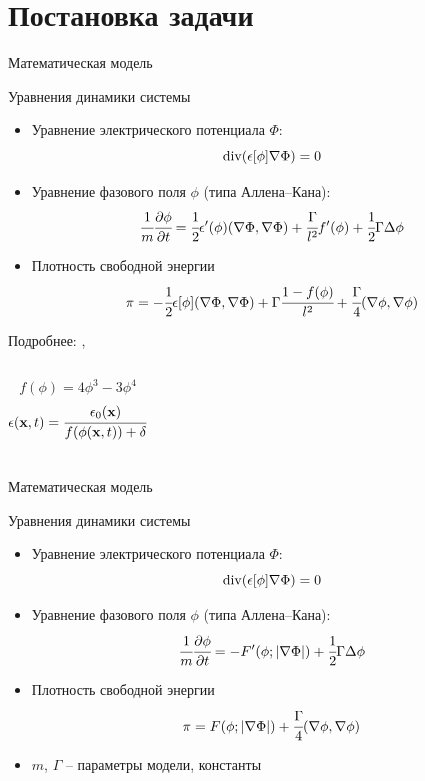 
\section{Постановка задачи}

\begin{frame}{Математическая модель}
\vspace{-0.3cm}
\begin{block}{Уравнения динамики системы}
	\begin{itemize}
		\item Уравнение электрического потенциала $\Phi$:
		\[
			\operatorname{{div}}(\epsilon[\phi] \nabla \Phi) = 0
		\]
		\item Уравнение фазового поля $\phi$ (типа Аллена--Кана):
		\[
			\cfrac{1}{m} \cfrac{\partial \phi}{\partial t} = \cfrac{1}{2} \epsilon'(\phi) (\nabla \Phi, \nabla \Phi) + \cfrac{\Gamma}{l^2} f'(\phi) + \cfrac{1}{2} \Gamma \Delta \phi
		\]
	\end{itemize}
\end{block}
\begin{itemize}
	\item Плотность свободной энергии
	\vspace{-0.2cm}
	\[
		\pi = -\cfrac{1}{2} \epsilon[\phi] (\nabla \Phi, \nabla \Phi) + \Gamma \cfrac{1 - f(\phi)}{l^2} + \cfrac{\Gamma}{4} (\nabla \phi, \nabla \phi)
	\]
\end{itemize}
\vspace{-1.9cm}
{\raggedleft Подробнее: \cite{ponomarev_stability}, \cite{zipunova_higher_codimension} \par}
\vspace{0.9cm}
\begin{columns}
	\vspace{0.35cm}
	\[
		f(\phi) = 4 \phi^3 - 3 \phi^4
	\]
	\[
		\epsilon({\textbf{x}}, t) = \cfrac{\epsilon_0({\textbf{x}})}{f(\phi({\textbf{x}}, t)) + \delta}
	\]
\end{columns}
\end{frame}


\begin{frame}{Математическая модель}
\vspace{-0.3cm}
\begin{block}{Уравнения динамики системы}
	\begin{itemize}
		\item Уравнение электрического потенциала $\Phi$:
		\[
			\operatorname{{div}}(\epsilon[\phi] \nabla \Phi) = 0
		\]
		\item Уравнение фазового поля $\phi$ (типа Аллена--Кана):
		\[
			\cfrac{1}{m} \cfrac{\partial \phi}{\partial t} = -F'(\phi; |\nabla \Phi|) + \cfrac{1}{2} \Gamma \Delta \phi
		\]
	\end{itemize}
\end{block}
\begin{itemize}
	\item Плотность свободной энергии
	\vspace{-0.2cm}
	\[
		\pi = F(\phi; |\nabla \Phi|) + \cfrac{\Gamma}{4} (\nabla \phi, \nabla \phi)
	\]
	\item $m$, $\Gamma$ -- параметры модели, константы
\end{itemize}
\end{frame}


